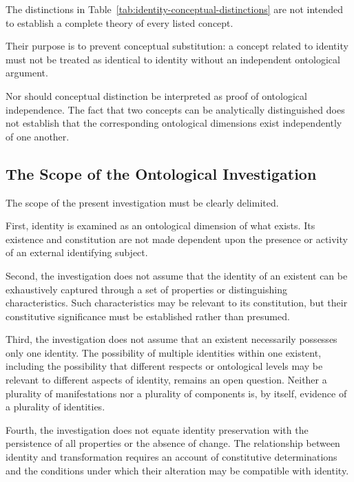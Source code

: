 The distinctions in Table~\ref{tab:identity-conceptual-distinctions}
are not intended to establish a complete theory
of every listed concept.

Their purpose is to prevent conceptual substitution:
a concept related to identity must not be treated
as identical to identity without an independent
ontological argument.

Nor should conceptual distinction be interpreted
as proof of ontological independence. The fact
that two concepts can be analytically distinguished
does not establish that the corresponding
ontological dimensions exist independently
of one another.



\subsection{The Scope of the Ontological Investigation}

The scope of the present investigation
must be clearly delimited.

First, identity is examined as an ontological
dimension of what exists. Its existence
and constitution are not made dependent upon
the presence or activity of an external
identifying subject.

Second, the investigation does not assume
that the identity of an existent can be
exhaustively captured through a set of
properties or distinguishing characteristics.
Such characteristics may be relevant to
its constitution, but their constitutive
significance must be established rather
than presumed.

Third, the investigation does not assume
that an existent necessarily possesses
only one identity. The possibility of
multiple identities within one existent,
including the possibility that different
respects or ontological levels may be relevant
to different aspects of identity, remains
an open question. Neither a plurality of
manifestations nor a plurality of components
is, by itself, evidence of a plurality
of identities.

Fourth, the investigation does not equate
identity preservation with the persistence
of all properties or the absence of change.
The relationship between identity and
transformation requires an account of
constitutive determinations and the
conditions under which their alteration
may be compatible with identity.

